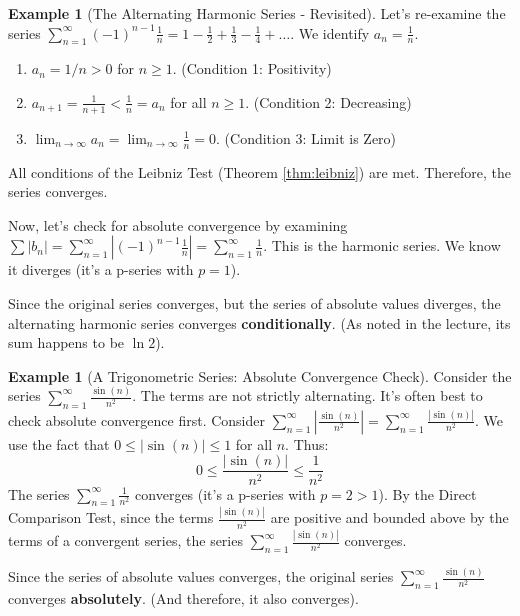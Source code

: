 \documentclass[11pt, a4paper]{article}
\theoremstyle{plain} %
\theoremstyle{definition} %
\newtheorem{example}[theorem]{Example}
\newcommand{\abs}[1]{\left|#1\right|} %
\begin{document}
\begin{example}[The Alternating Harmonic Series - Revisited]\label{ex:alt_harmonic_revisited}
Let's re-examine the series $\sum_{n=1}^{\infty} (-1)^{n-1} \frac{1}{n} = 1 - \frac{1}{2} + \frac{1}{3} - \frac{1}{4} + \dots$.
We identify $a_n = \frac{1}{n}$.
\begin{enumerate}
    \item $a_n = 1/n > 0$ for $n \ge 1$. (Condition 1: Positivity)
    \item $a_{n+1} = \frac{1}{n+1} < \frac{1}{n} = a_n$ for all $n \ge 1$. (Condition 2: Decreasing)
    \item $\lim_{n \to \infty} a_n = \lim_{n \to \infty} \frac{1}{n} = 0$. (Condition 3: Limit is Zero)
\end{enumerate}
All conditions of the Leibniz Test (Theorem \ref{thm:leibniz}) are met. Therefore, the series converges.

Now, let's check for absolute convergence by examining $\sum |b_n| = \sum_{n=1}^{\infty} \abs{(-1)^{n-1} \frac{1}{n}} = \sum_{n=1}^{\infty} \frac{1}{n}$.
This is the harmonic series. We know it diverges (it's a p-series with $p=1$).

Since the original series converges, but the series of absolute values diverges, the alternating harmonic series converges \textbf{conditionally}. (As noted in the lecture, its sum happens to be $\ln 2$).
\end{example}

\begin{example}[A Trigonometric Series: Absolute Convergence Check]\label{ex:sin_n_sq_revisited}
Consider the series $\sum_{n=1}^{\infty} \frac{\sin(n)}{n^2}$.
The terms are not strictly alternating. It's often best to check absolute convergence first.
Consider $\sum_{n=1}^{\infty} \abs{\frac{\sin(n)}{n^2}} = \sum_{n=1}^{\infty} \frac{|\sin(n)|}{n^2}$.
We use the fact that $0 \le |\sin(n)| \le 1$ for all $n$. Thus:
$$ 0 \le \frac{|\sin(n)|}{n^2} \le \frac{1}{n^2} $$
The series $\sum_{n=1}^{\infty} \frac{1}{n^2}$ converges (it's a p-series with $p=2 > 1$).
By the Direct Comparison Test, since the terms $\frac{|\sin(n)|}{n^2}$ are positive and bounded above by the terms of a convergent series, the series $\sum_{n=1}^{\infty} \frac{|\sin(n)|}{n^2}$ converges.

Since the series of absolute values converges, the original series $\sum_{n=1}^{\infty} \frac{\sin(n)}{n^2}$ converges \textbf{absolutely}. (And therefore, it also converges).
\end{example}
\end{document}
